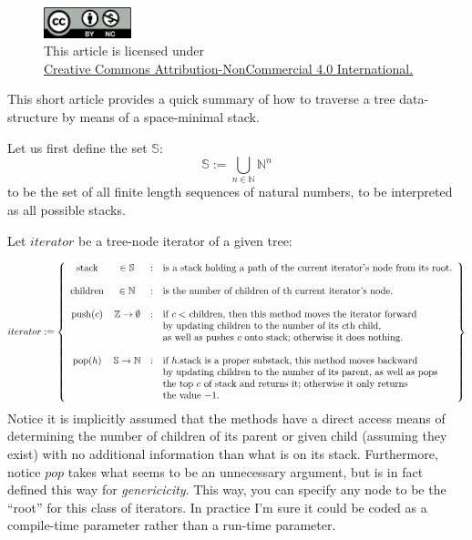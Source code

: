 \documentclass[twoside]{article}
\begin{document}
\begin{figure}[h]
\centering
\includegraphics[width=1in]{cc-by-nc.png}\\[0.1in]
\tiny This article is licensed under \\
\href{http://creativecommons.org/licenses/by-nc/4.0/}
{Creative Commons Attribution-NonCommercial 4.0 International.}\\[0.3in]
\end{figure}

This short article provides a quick summary of how to traverse a tree data-structure by means of a space-minimal stack.

Let us first define the set $ \mathbb{S} $:
$$ \mathbb{S} := \bigcup_{n\in\mathbb{N}}\mathbb{N}^n $$
to be the set of all finite length sequences of natural numbers, to be interpreted as all possible stacks.

Let $ iterator $ be a tree-node iterator of a given tree:

$$ iterator:=
\left\{\begin{array}{cccl}
\mbox{stack}		& \in\mathbb{S}			& : & \mbox{is a stack holding a path of the current iterator's node from its root.} \\
			&				&   & \\
\mbox{children}		& \in\mathbb{N}			& : & \mbox{is the number of children of th current iterator's node.} \\
			&				&   & \\
\mbox{push($ c $)}	& \mathbb{Z}\to\emptyset	& : & \mbox{if $ c < $ children, then this method moves the iterator forward} \\
			&				&   & \mbox{by updating children to the number of its $ c $th child,} \\
			&				&   & \mbox{as well as pushes $ c $ onto stack; otherwise it does nothing.} \\
			&				&   & \\
\mbox{pop($ h $)}	& \mathbb{S}\to\mathbb{N}	& : & \mbox{if $ h $.stack is a proper substack, this method moves backward} \\
			&				&   & \mbox{by updating children to the number of its parent, as well as pops} \\
			&				&   & \mbox{the top $ c $ of stack and returns it; otherwise it only returns} \\
			&				&   & \mbox{the value $ -1 $.}
\end{array}\right\} $$
Notice it is implicitly assumed that the methods have a direct access means of determining the number of children of
its parent or given child (assuming they exist) with no additional information than what is on its stack. Furthermore,
notice $ pop $ takes what seems to be an unnecessary argument, but is in fact defined this way for \emph{genericicity}.
This way, you can specify any node to be the ``root'' for this class of iterators. In practice I'm sure it could be coded
as a compile-time parameter rather than a run-time parameter.
\end{document}

